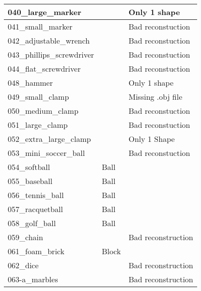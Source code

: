 \documentclass{article}
\begin{document}
\begin{longtable}{|l|l|l|}
040\_large\_marker           &                & Only 1 shape                          \\ \hline
041\_small\_marker           &                & Bad reconstuction                     \\ \hline
042\_adjustable\_wrench      &                & Bad reconstuction                     \\ \hline
043\_phillips\_screwdriver   &                & Bad reconstuction                     \\ \hline
044\_flat\_screwdriver       &                & Bad reconstuction                     \\ \hline
048\_hammer                  &                & Only 1 shape                          \\ \hline
049\_small\_clamp            &                & Missing .obj file                     \\ \hline
050\_medium\_clamp           &                & Bad reconstuction                     \\ \hline
051\_large\_clamp            &                & Bad reconstuction                     \\ \hline
052\_extra\_large\_clamp     &                & Only 1 Shape                          \\ \hline
053\_mini\_soccer\_ball      &                & Bad reconstuction                     \\ \hline
054\_softball                & Ball           &                                       \\ \hline
055\_baseball                & Ball           &                                       \\ \hline
056\_tennis\_ball            & Ball           &                                       \\ \hline
057\_racquetball             & Ball           &                                       \\ \hline
058\_golf\_ball              & Ball           &                                       \\ \hline
059\_chain                   &                & Bad reconstruction                    \\ \hline
061\_foam\_brick             & Block          &                                       \\ \hline
062\_dice                    &                & Bad reconstruction                    \\ \hline
063-a\_marbles               &                & Bad reconstruction                    \\ \hline

\end{longtable}
\end{document}
